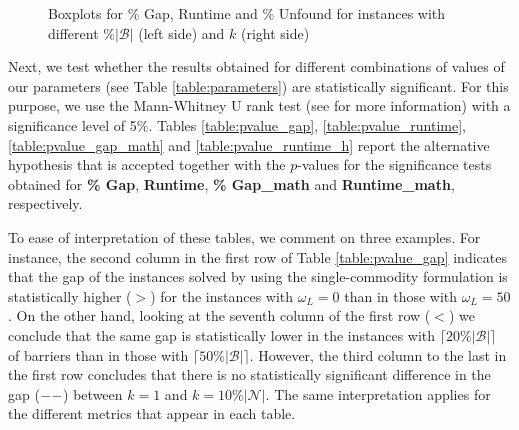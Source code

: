 \documentclass[a4paper,  review, authoryear, 1p.]{elsarticle}
\begin{document}
		\begin{figure}[h!]
			\centering
			\caption{Boxplots for \% Gap, Runtime and \% Unfound for instances with different $\%|\mathcal B|$ (left side) and $k$ (right side)}

			
			\label{fig:results_percentage}
					
		\end{figure}

		
		Next, we test whether the results obtained for different combinations of values of our parameters (see Table \ref{table:parameters}) are statistically significant. For this purpose, we use the Mann-Whitney U rank test (see \cite{mcknight2010} for more information) with a significance level of 5\%. Tables \ref{table:pvalue_gap}, \ref{table:pvalue_runtime}, \ref{table:pvalue_gap_math} and \ref{table:pvalue_runtime_h} report the alternative hypothesis that is accepted together with the $p$-values for the significance tests obtained for \textbf{\% Gap}, \textbf{Runtime}, \textbf{\% Gap\_{math}} and \textbf{Runtime\_{math}}, respectively.

		To ease of interpretation of these tables, we comment on three examples. For instance, the second column in the first row of Table \ref{table:pvalue_gap} indicates that 
 the gap of the instances solved by using the single-commodity formulation is statistically higher ($>$) for the instances with $\omega_L=0$ than in those with $\omega_L=50$. On the other hand, looking at the seventh column of the first row ($<$) we conclude that the same gap is statistically lower in the instances with $\lceil 20 \%|\mathcal B|\rceil$ of barriers than in those with $\lceil 50 \%|\mathcal B|\rceil$. However, the third column to the last in the first row concludes that there is no statistically significant difference in the gap ($\---$) between $k=1$ and $k=10\%|\mathcal N|$. The same interpretation applies for the different metrics that appear in each table.
 		
\end{document}
